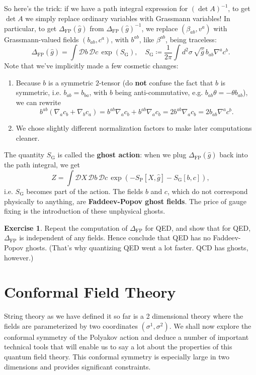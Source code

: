 \documentclass{report}
\theoremstyle{plain}
\theoremstyle{definition}
\newtheorem{exercise}{Exercise}[section]
\theoremstyle{remark}
\newcommand{\sg}{\sigma}
\newcommand{\cD}{\mathcal{D}}
\newcommand{\detFP}{\Delta_{\text{FP}}}
\begin{document}
So here's the trick: if we have a path integral expression for $(\det
A)^{-1}$, to get $\det A$ we simply replace ordinary variables with
Grassmann variables! In particular, to get $\detFP(\hat{g})$ from
$\detFP(\hat{g})^{-1}$, we replace $(\beta_{ab}, v^a)$ with
Grassmann-valued fields $(b_{ab}, c^a)$, with $b^{ab}$, like
$\beta^{ab}$, being traceless:
\[ \detFP(\hat{g}) = \int \cD b \, \cD c \, \exp(S_{\text{G}}), \quad S_{\text{G}} \coloneqq \frac{1}{2\pi} \int d^2\sigma \, \sqrt{\hat{g}} \, b_{ab} \nabla^a c^b. \]
Note that we've implicitly made a few cosmetic changes:
\begin{enumerate}
\item Because $b$ is a symmetric $2$-tensor (do {\bf not} confuse the
  fact that $b$ is symmetric, i.e. $b_{ab} = b_{ba}$, with $b$ being
  anti-commutative, e.g. $b_{ab}\theta = -\theta b_{ab}$), we can
  rewrite
  \[ b^{ab}(\nabla_a c_b + \nabla_b c_a) = b^{ab}\nabla_a c_b + b^{ab} \nabla_a c_b = 2b^{ab}\nabla_a c_b = 2b_{ab} \nabla^a c^b. \]
\item We chose slightly different normalization factors to make later
  computations cleaner.
\end{enumerate}
The quantity $S_{\text{G}}$ is called the {\bf ghost action}: when we
plug $\detFP(\hat{g})$ back into the path integral, we get
\[ Z = \int \cD X \, \cD b \, \cD c \, \exp(-S_{\text{P}}[X, \hat{g}] - S_{\text{G}}[b, c]), \]
i.e. $S_{\text{G}}$ becomes part of the action. The fields $b$ and
$c$, which do not correspond physically to anything, are {\bf
  Faddeev-Popov ghost fields}. The price of gauge fixing is the
introduction of these unphysical ghosts.

\begin{exercise}
  Repeat the computation of $\detFP$ for QED, and show that for QED,
  $\detFP$ is independent of any fields. Hence conclude that QED has
  no Faddeev-Popov ghosts. (That's why quantizing QED went a lot
  faster. QCD has ghosts, however.)
\end{exercise}

\chapter{Conformal Field Theory}
String theory as we have defined it so far is a 2 dimensional theory where
the fields are parameterized by two coordinates $(\sg^1,\sg^2)$. We shall
now explore the conformal symmetry of the Polyakov action and deduce a
number of important technical tools that will enable us to say a lot about
the properties of this quantum field theory. This conformal symmetry is
especially large in two dimensions and provides significant
constraints.
\end{document}
